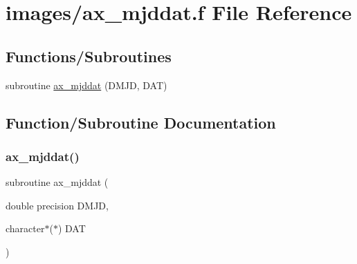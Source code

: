 \hypertarget{ax__mjddat_8f}{}\section{images/ax\+\_\+mjddat.f File Reference}
\label{ax__mjddat_8f}
\subsection*{Functions/\+Subroutines}
\begin{DoxyCompactItemize}
\item 
subroutine \hyperlink{ax__mjddat_8f_ab9b40911253eb8c9d0e5c8c10382a96c}{ax\+\_\+mjddat} (D\+M\+JD, D\+AT)
\end{DoxyCompactItemize}


\subsection{Function/\+Subroutine Documentation}
\mbox{\label{ax__mjddat_8f_ab9b40911253eb8c9d0e5c8c10382a96c}} 
\subsubsection{\texorpdfstring{ax\+\_\+mjddat()}{ax\_mjddat()}}
{\footnotesize\ttfamily subroutine ax\+\_\+mjddat (\begin{DoxyParamCaption}\item[{double precision}]{D\+M\+JD,  }\item[{character$\ast$($\ast$)}]{D\+AT }\end{DoxyParamCaption})}

